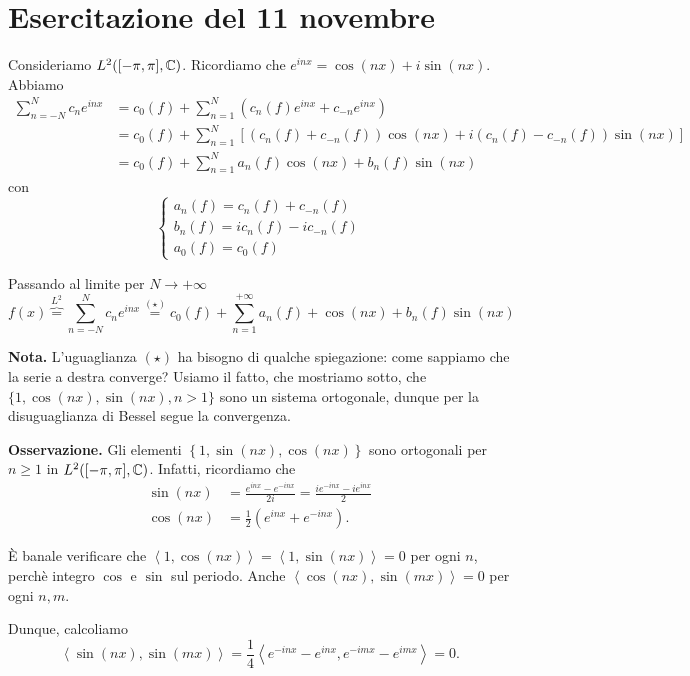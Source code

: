 %
%

\section{Esercitazione del 11 novembre}

Consideriamo $L^2([-\pi,\pi], \mathbb C) $. Ricordiamo che $e^{inx} = \cos(nx) + i \sin(nx)$. 
Abbiamo
%
\begin{align*}
\sum_{n=-N}^N c_n e^{inx} & = c_0(f) + \sum_{n=1}^N \left( c_n(f) e^{inx} + c_{-n} e^{inx} \right) \\
& = c_0(f) + \sum_{n=1}^{N} \left[ \left( c_n(f) + c_{-n}(f) \right) \cos(nx) + i\left( c_n(f) - c_{-n}(f) \right) \sin(nx) \right] \\
& = c_0(f) + \sum_{n=1}^{N} a_n(f) \cos(nx) + b_n(f) \sin(nx)  
\end{align*}
con
%
$$
\begin{cases}
a_n(f) = c_n(f) + c_{-n}(f) \\
b_n(f) = i c_n(f) - i c_{-n} (f) \\
a_0(f) = c_0(f)
\end{cases} 
$$
%

Passando al limite per $N \to +\infty$
%
$$
f(x) \overbrace{=}^{L^2} \sum_{n=-N}^N c_n e^{inx} 
\overset{(\star)}{=} c_0(f) + \sum_{n=1}^{+\infty} a_n(f) + \cos(nx) + b_n(f) \sin(nx) 
$$
%

\textbf{Nota.} L'uguaglianza $(\star)$ ha bisogno di qualche spiegazione: come sappiamo che la serie a destra converge? Usiamo il fatto, che mostriamo sotto, che $\{1, \cos(nx), \sin(nx), n > 1 \}$ sono un sistema ortogonale, dunque per la disuguaglianza di Bessel segue la convergenza.

\textbf{Osservazione.} Gli elementi $\left\{ 1, \sin(nx), \cos(nx) \right\}$ sono ortogonali per $n \geq 1$ in $L^2([-\pi,\pi], \mathbb C) $.
Infatti, ricordiamo che
\begin{align*}
\sin(nx) & = \frac{e^{inx} - e^{-inx}}{2i} = \frac{i e^{-inx} - i e^{inx}}{2} \\
\cos(nx) & = \frac{1}{2} \left( e^{inx} + e^{-inx} \right).
\end{align*}

È banale verificare che $\left<1,\cos(nx) \right> = \left<1, \sin(nx) \right> = 0$ per ogni  $n$, perchè integro $\cos$ e $\sin$ sul periodo. Anche $\left<\cos(nx), \sin(mx) \right> = 0$ per ogni $n,m$.

Dunque, calcoliamo
%
$$
\left<\sin(nx), \sin(mx) \right> = \frac{1}{4} \left<e^{-inx} - e^{inx}, e^{-imx} - e^{imx} \right> = 0.
$$
%

